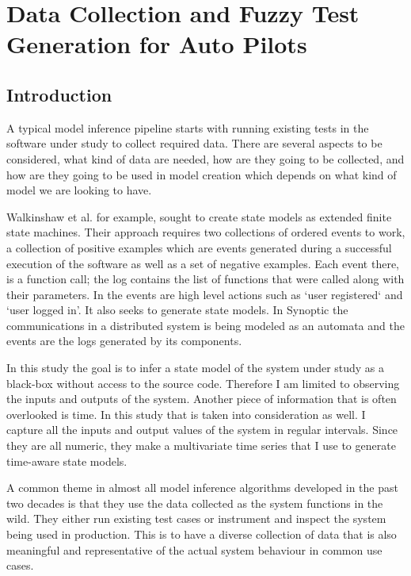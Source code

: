 \chapter{Data Collection and Fuzzy Test Generation for Auto Pilots}\label{chapter:fuzz_tester}
\section{Introduction}
A typical model inference pipeline starts with running existing tests in the software under study to collect required data. \cite{Papadopoulos2015} There are several aspects to be considered, what kind of data are needed, how are they going to be collected, and how are they going to be used in model creation which depends on what kind of model we are looking to have. 

Walkinshaw et al. for example, \cite{walkinshaw2016inferring} sought to create state models as extended finite state machines. Their approach requires two collections of ordered events to work, a collection of positive examples which are events generated during a successful execution of the software as well as a set of negative examples. Each event there, is a function call; the log contains the list of functions that were called along with their parameters. 
In \cite{howar2012inferring} the events are high level actions such as `user registered` and `user logged in'. It also seeks to generate state models.
In Synoptic \cite{schneider2010synoptic} the communications in a distributed system is being modeled as an automata and the events are the logs generated by its components.


In this study the goal is to infer a state model of the system under study as a black-box without access to the source code. Therefore I am limited to observing the inputs and outputs of the system. Another piece of information that is often overlooked is time. In this study that is taken into consideration as well. I capture all the inputs and output values of the system in regular intervals. Since they are all numeric, they make a multivariate time series that I use to generate time-aware state models. 


A common theme in almost all model inference algorithms developed in the past two decades is that they use the data collected as the system functions in the wild. They either run existing test cases or instrument and inspect the system being used in production. 
This is to have a diverse collection of data that is also meaningful and representative of the actual system behaviour in common use cases.

